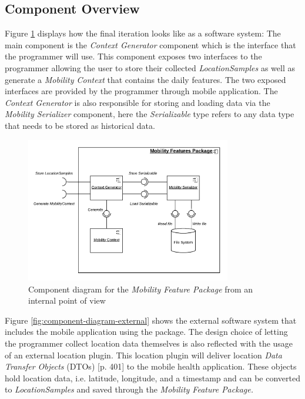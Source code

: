 \subsection{Component Overview}
Figure \ref{fig:component-diagram-internal} displays how the final iteration looks like as a software system: The main component is the \textit{Context Generator} component which is the interface that the programmer will use. This component exposes two interfaces to the programmer allowing the user to store their collected \textit{LocationSamples} as well as generate a \textit{Mobility Context} that contains the daily features. The two exposed interfaces are provided by the programmer through mobile application. The \textit{Context Generator} is also responsible for storing and loading data via the \textit{Mobility Serializer} component, here the \textit{Serializable} type refers to any data type that needs to be stored as historical data.

\begin{figure}[h]
\centering
\includegraphics[width=0.8\textwidth]{images/diagrams/component-internal.pdf}
\caption{Component diagram for the \textit{Mobility Feature Package} from an internal point of view}
\label{fig:component-diagram-internal}
\end{figure}

Figure \ref{fig:component-diagram-external} shows the external software system that includes the mobile application using the package. The design choice of letting the programmer collect location data themselves is also reflected with the usage of an external location plugin. This location plugin will deliver location \textit{Data Transfer Objects} (DTOs) \cite{fowler-PEEA} [p. 401] to the mobile health application. These objects hold location data, i.e. latitude, longitude, and a timestamp and can be converted to \textit{LocationSamples} and saved through the \textit{Mobility Feature Package.}


